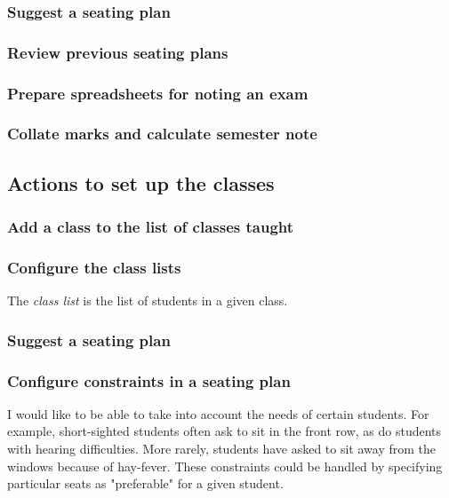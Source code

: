 \documentclass[10pt]{article}
\begin{document}
\subsubsection{Suggest a seating plan}

\subsubsection{Review previous seating plans}

\subsubsection{Prepare spreadsheets for noting an exam}

\subsubsection{Collate marks and calculate semester note}





\subsection{Actions to set up the classes}
 
\subsubsection{Add a class to the list of classes taught}

\subsubsection{Configure the class lists}
The \emph{class list} is the list of students in a given class.

\subsubsection{Suggest a seating plan}

\subsubsection{Configure constraints in a seating plan}
I would like to be able to take into account the needs of certain students. For example, short-sighted students often ask to sit in the front row, as do students with hearing difficulties. More rarely, students have asked to sit away from the windows because of hay-fever. These constraints could be handled by specifying particular seats as "preferable" for a given student.
\end{document}
